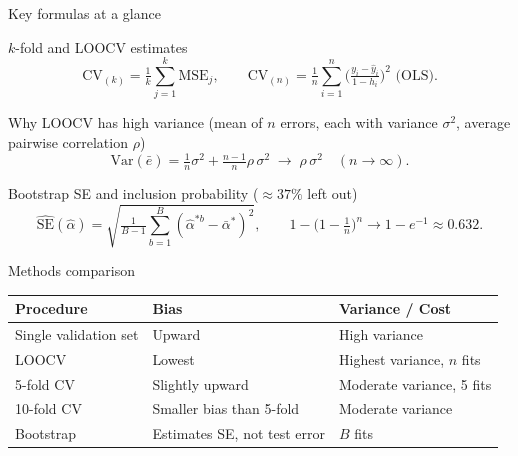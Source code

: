 \documentclass[aspectratio=169,11pt]{beamer}
\begin{document}
\begin{frame}{Key formulas at a glance}
  \small
  \begin{block}{$k$-fold and LOOCV estimates}
    \[
      \mathrm{CV}_{(k)} = \tfrac{1}{k}\sum_{j=1}^{k}\mathrm{MSE}_j,
      \qquad
      \mathrm{CV}_{(n)} = \tfrac{1}{n}\sum_{i=1}^{n}\bigl(\tfrac{y_i - \hat y_i}{1 - h_i}\bigr)^2 \text{ (OLS).}
    \]
  \end{block}
  \begin{block}{Why LOOCV has high variance (mean of $n$ errors, each with
    variance $\sigma^2$, average pairwise correlation $\rho$)}
    \[
      \mathrm{Var}(\bar e) = \tfrac{1}{n}\sigma^2 + \tfrac{n-1}{n}\rho\,\sigma^2
      \;\longrightarrow\; \rho\,\sigma^2 \quad (n \to \infty).
    \]
  \end{block}
  \begin{block}{Bootstrap SE and inclusion probability ($\approx 37\%$ left out)}
    \[
      \widehat{\mathrm{SE}}(\hat\alpha) =
        \sqrt{\tfrac{1}{B-1}\sum_{b=1}^{B}(\hat\alpha^{*b} - \bar\alpha^*)^2},
      \qquad
      1 - \bigl(1 - \tfrac1n\bigr)^{n} \to 1 - e^{-1} \approx 0.632 .
    \]
  \end{block}
\end{frame}

\begin{frame}{Methods comparison}
  \footnotesize
  \begin{tabular}{lll}
    \toprule
    \textbf{Procedure} & \textbf{Bias} & \textbf{Variance / Cost} \\
    \midrule
    Single validation set & Upward & High variance \\
    LOOCV & Lowest & Highest variance, $n$ fits \\
    5-fold CV & Slightly upward & Moderate variance, 5 fits \\
    10-fold CV & Smaller bias than 5-fold & Moderate variance \\
    Bootstrap & Estimates SE, not test error & $B$ fits \\
    \bottomrule
  \end{tabular}
\end{frame}
\end{document}
